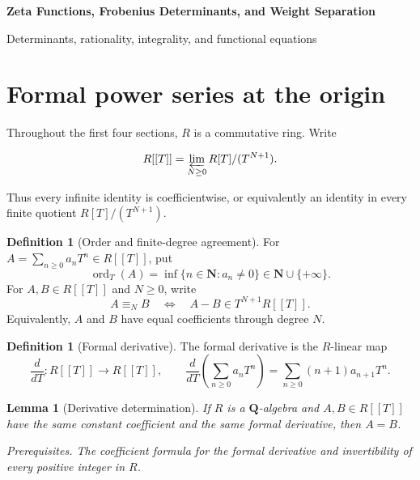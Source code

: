 \documentclass[10pt]{article}
\newtheorem{lemma}[theorem]{Lemma}
\theoremstyle{definition}
\newtheorem{definition}[theorem]{Definition}
\newcommand{\ord}{\operatorname{ord}}
\newcommand{\deps}[1]{\par\smallskip\noindent\textit{Prerequisites.} #1}
\begin{document}
\begin{center}
{\large\bfseries Zeta Functions, Frobenius Determinants, and Weight Separation\par}
\medskip
{\normalsize Determinants, rationality, integrality, and functional equations\par}
\end{center}

\begin{abstract}
Let \(X_0\) be a finite-type scheme over a finite field.  This note develops
the algebraic passage from finite Frobenius orbits and the trace formula to
the cohomological factorization of \(Z(X_0,T)\).  It then separates the
individual factors by weight, descends them to integral polynomials
independent of the auxiliary prime, and derives the raw and normalized
functional equations from perfect Frobenius pairings.  Every intermediate
notion used in the statements is defined explicitly.
\end{abstract}

\tableofcontents

\section{Formal power series at the origin}

Throughout the first four sections, \(R\) is a commutative ring.  Write

\[
 R[[T]]=\varprojlim_{N\geq 0}R[T]/(T^{N+1}).
\]

Thus every infinite identity is coefficientwise, or equivalently an
identity in every finite quotient \(R[T]/(T^{N+1})\).

\begin{definition}[Order and finite-degree agreement]
For \(A=\sum_{n\geq0}a_nT^n\in R[[T]]\), put
\[
 \ord_T(A)=\inf\{n\in\mathbf N:a_n\neq0\}\in
 \mathbf N\cup\{+\infty\}.
\]
For \(A,B\in R[[T]]\) and \(N\geq0\), write
\[
 A\equiv_N B
 \quad\Longleftrightarrow\quad
 A-B\in T^{N+1}R[[T]].
\]
Equivalently, \(A\) and \(B\) have equal coefficients through degree \(N\).
\end{definition}

\begin{definition}[Formal derivative]
The formal derivative is the \(R\)-linear map
\[
 \frac{d}{dT}:R[[T]]\longrightarrow R[[T]],\qquad
 \frac{d}{dT}\left(\sum_{n\geq0}a_nT^n\right)
 =\sum_{n\geq0}(n+1)a_{n+1}T^n.
\]
\end{definition}

\begin{lemma}[Derivative determination]
If \(R\) is a \(\mathbf Q\)-algebra and \(A,B\in R[[T]]\) have the same
constant coefficient and the same formal derivative, then \(A=B\).
\deps{The coefficient formula for the formal derivative and invertibility
of every positive integer in \(R\).}
\end{lemma}
\end{document}
